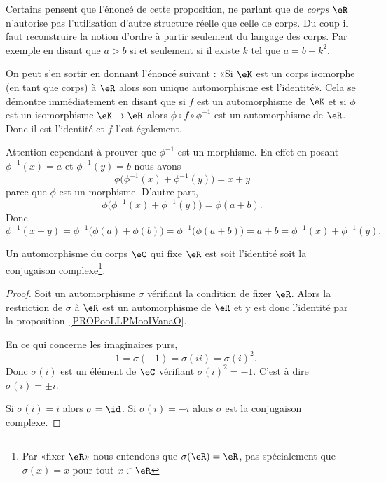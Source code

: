 \begin{remark}      \label{REMooGHEDooOYYUPk}
    Certains\cite{ooEKUSooDDDWuT} pensent que l'énoncé de cette proposition, ne parlant que de \emph{corps} \( \eR\) n'autorise pas l'utilisation d'autre structure réelle que celle de corps. Du coup il faut reconstruire la notion d'ordre à partir seulement du langage des corps. Par exemple en disant que \( a>b\) si et seulement si il existe \( k\) tel que \( a=b+k^2\).

    On peut s'en sortir en donnant l'énoncé suivant : «Si \( \eK\) est un corps isomorphe (en tant que corps) à \( \eR\) alors son unique automorphisme est l'identité». Cela se démontre immédiatement en disant que si \( f\) est un automorphisme de \( \eK\) et si \( \phi\) est un isomorphisme \( \eK\to \eR\) alors \( \phi\circ f\circ \phi^{-1}\) est un automorphisme de \( \eR\). Donc il est l'identité et \( f\) l'est également.

    Attention cependant à prouver que \( \phi^{-1}\) est un morphisme. En effet en posant \( \phi^{-1}(x)=a\) et \( \phi^{-1}(y)=b\) nous avons
    \begin{equation}
        \phi\big( \phi^{-1}(x)+\phi^{-1}(y) \big)=x+y
    \end{equation}
    parce que \( \phi\) est un morphisme. D'autre part,
    \begin{equation}
        \phi\big( \phi^{-1}(x)+\phi^{-1}(y) \big)=\phi(a+b).
    \end{equation}
    Donc
    \begin{equation}
        \phi^{-1}(x+y)=\phi^{-1}\big( \phi(a)+\phi(b) \big)=\phi^{-1}\big( \phi(a+b) \big)=a+b=\phi^{-1}(x)+\phi^{-1}(y).
    \end{equation}
\end{remark}

\begin{proposition}     \label{PROPooEATMooIPPrRV}
    Un automorphisme du corps \( \eC\) qui fixe \( \eR\) est soit l'identité soit la conjugaison complexe\footnote{Par «fixer \( \eR\)» nous entendons que \( \sigma(\eR)=\eR\), pas spécialement que \( \sigma(x)=x\) pour tout \( x\in \eR\)}.
\end{proposition}

\begin{proof}
    Soit un automorphisme \( \sigma\) vérifiant la condition de fixer \( \eR\). Alors la restriction de \( \sigma\) à \( \eR\) est un automorphisme de \( \eR\) et y est donc l'identité par la proposition~\ref{PROPooLLPMooIVanaO}.

    En ce qui concerne les imaginaires purs,
    \begin{equation}
        -1=\sigma(-1)=\sigma(ii)=\sigma(i)^2.
    \end{equation}
    Donc \( \sigma(i)\) est un élément de \( \eC\) vérifiant \( \sigma(i)^2=-1\). C'est à dire \( \sigma(i)=\pm i\).

    Si \( \sigma(i)=i\) alors \( \sigma=\id\). Si \( \sigma(i)=-i\) alors \( \sigma\) est la conjugaison complexe.
\end{proof}

